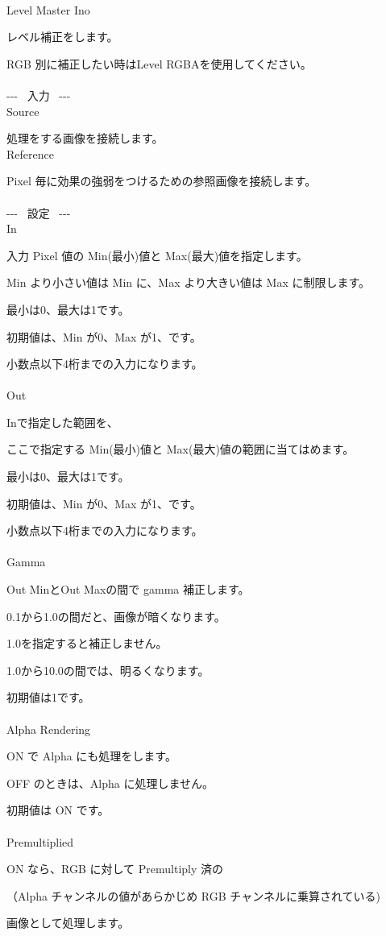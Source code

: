 \documentclass[a4paper,12pt]{article}
\begin{document}
\thispagestyle{empty}

\Large
\noindent \\
Level Master Ino\medskip
\par
\normalsize
レベル補正をします。\par
RGB 別に補正したい時は\textquotedbl Level RGBA\textquotedbl を使用してください。\\
\\
-{-}- \ 入力 \ -{-}-\\
Source\par
処理をする画像を接続します。\\
Reference\par
Pixel 毎に効果の強弱をつけるための参照画像を接続します。\\
\\
-{-}- \ 設定 \ -{-}-\\
In\par
入力 Pixel 値の Min(最小)値と Max(最大)値を指定します。\par
Min より小さい値は Min に、Max より大きい値は Max に制限します。\par
最小は0、最大は1です。\par
初期値は、Min が0、Max が1、です。\par
小数点以下4桁までの入力になります。\\
\\
Out\par
\textquotedbl In\textquotedbl で指定した範囲を、\par
ここで指定する Min(最小)値と Max(最大)値の範囲に当てはめます。\par
最小は0、最大は1です。\par
初期値は、Min が0、Max が1、です。\par
小数点以下4桁までの入力になります。\\
\\
Gamma\par
\textquotedbl Out Min\textquotedbl と\textquotedbl Out Max\textquotedbl の間で gamma 補正します。\par
0.1から1.0の間だと、画像が暗くなります。\par
1.0を指定すると補正しません。\par
1.0から10.0の間では、明るくなります。\par
初期値は1です。\\
\\
Alpha Rendering\par
ON で Alpha にも処理をします。\par
OFF のときは、Alpha に処理しません。\par
初期値は ON です。\\
\\
Premultiplied\par
ON なら、RGB に対して Premultiply 済の\par
（Alpha チャンネルの値があらかじめ RGB チャンネルに乗算されている)\par
画像として処理します。
\end{document}
